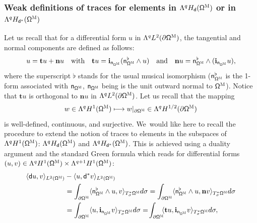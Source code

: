 \documentclass[JEP,XML,SOM,Unicode,NoEqCountersInSection,NoFloatCountersInSection,published]{cedram}
\newcommand\mto{\mathchoice{\longmapsto}{\mapsto}{\mapsto}{\mapsto}}
\newcommand{\mbf}[1]{\mathbf{#1}}
\let\pa\partial
\theoremstyle{plain}
\theoremstyle{definition}
\begin{document}
\subsubsection*{Weak definitions of traces for elements in $\Lambda^q H_{\mathsf d} (\mathsf \Omega^{\textsc{M}})$ or in $\Lambda^q H_{\mathsf d^*} (\mathsf \Omega^{\textsc{M}})$}
Let us recall that for a differential form $u$ in $\Lambda^qL^2 (\pa\mathsf \Omega^{\textsc{M}})$, the tangential and normal components are defined as follows:
\begin{equation}
\label{eq.decomp-bdy}
u= \mathbf t u+\mathbf n u\quad\text{with}\quad
\mathbf t u= \mathbf{i}_{\mathsf n_{\mathsf \Omega^{\textsc{M}}}}(\mathsf n_{\mathsf \Omega^{\textsc{M}}}^{\flat} \wedge u)\quad\text{and}\quad
\mathbf n u= \mathsf n_{\mathsf \Omega^{\textsc{M}}}^{\flat}\wedge(\mathbf{i}_{\mathsf n_{\mathsf \Omega^{\textsc{M}}}} u),
\end{equation}
where the superscript $\flat$ stands for the usual musical
isomorphism ($\mathsf n_{\mathsf \Omega^{\textsc{M}}}^\flat$ is the 1-form associated with $\mathsf n_{\mathsf \Omega^{\textsc{M}}}$, $\mathsf n_{\mathsf \Omega^{\textsc{M}}}$ being is the unit outward normal to $\mathsf \Omega^{\textsc{M}}$). Notice that $\mathbf t u$ is orthogonal to $\mbf n u$ in $\Lambda^qL^2 (\pa\mathsf \Omega^{\textsc{M}})$. Let us
recall that the mapping
\begin{equation}
\label{eq.trace-usual}
w\in \Lambda^qH^1(\mathsf \Omega^{\textsc{M}})\mto w|_{\pa \mathsf \Omega^{\textsc{M}}}\in \Lambda^qH^{1/2} (\pa\mathsf \Omega^{\textsc{M}})
\end{equation}
is well-defined, continuous, and surjective. We~would like here to
recall the procedure to extend the notion of traces to elements in
the subspaces of $\Lambda^qH^1(\mathsf \Omega^{\textsc{M}})$: $\Lambda^q H_{\mathsf d} (\mathsf \Omega^{\textsc{M}})$ and $\Lambda^q H_{\mathsf d^*} (\mathsf \Omega^{\textsc{M}})$. This is achieved using a duality argument and the standard Green formula which reads for differential forms $(u,v)\in \Lambda^{q}H^1 (\mathsf \Omega^{\textsc{M}}) \times \Lambda^{q
+1}H^1 (\mathsf \Omega^{\textsc{M}})$:
\begin{align}
\label{eq:usual_Green}
\langle \mathsf du, v\rangle_{ L^2 (\mathsf \Omega^{\textsc{M}})}&-
\langle u, \mathsf d^*v\rangle_{ L^2 (\mathsf \Omega^{\textsc{M}})}\\
\nonumber&= \int_{\partial \mathsf \Omega^{\textsc{M}}} \langle \mathsf n_{\mathsf \Omega^{\textsc{M}}}^\flat \wedge u,v\rangle_{ T^*_{\sigma}\mathsf \Omega^{\textsc{M}}} d\sigma= \int_{\partial \mathsf \Omega^{\textsc{M}}} \langle \mathsf n_{\mathsf \Omega^{\textsc{M}}}^\flat \wedge u, \mathbf n v\rangle_{ T^*_{\sigma}\mathsf \Omega^{\textsc{M}}} d\sigma\\
&=\int_{\partial \mathsf \Omega^{\textsc{M}}} \langle u,\mathbf{i}_{\mathsf n_{\mathsf \Omega^{\textsc{M}}}} v\rangle_{ T^*_{\sigma}\mathsf \Omega^{\textsc{M}}} d\sigma=\! \int_{\partial \mathsf \Omega^{\textsc{M}}} \!\! \langle \mathbf t u,\mathbf{i}_{\mathsf n_{\mathsf \Omega^{\textsc{M}}}} v\rangle_{ T^*_{\sigma}\mathsf \Omega^{\textsc{M}}} d\sigma,\notag
\end{align}
\end{document}
